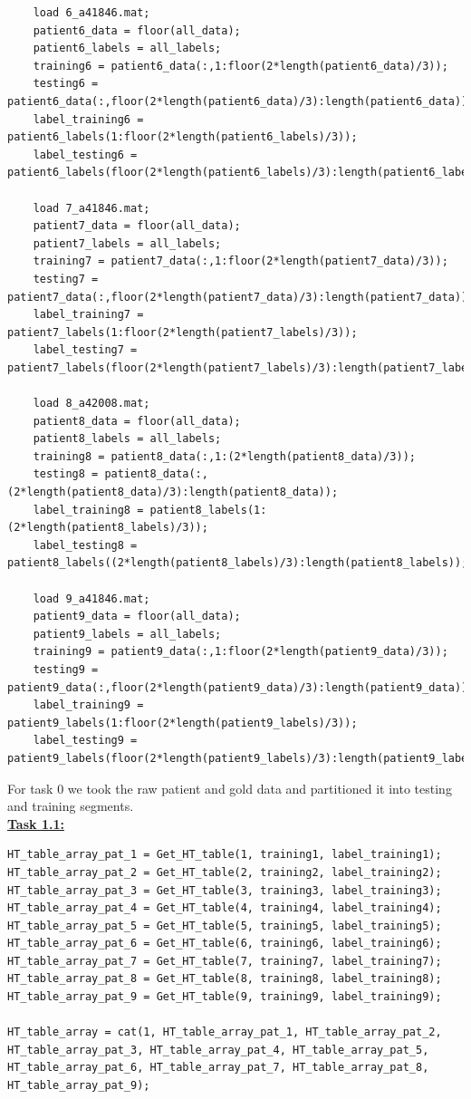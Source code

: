 \documentclass{article}
\begin{document}
\begin{lstlisting}
    load 6_a41846.mat;
    patient6_data = floor(all_data);
    patient6_labels = all_labels;
    training6 = patient6_data(:,1:floor(2*length(patient6_data)/3));
    testing6 = patient6_data(:,floor(2*length(patient6_data)/3):length(patient6_data));
    label_training6 = patient6_labels(1:floor(2*length(patient6_labels)/3));
    label_testing6 = patient6_labels(floor(2*length(patient6_labels)/3):length(patient6_labels));

    load 7_a41846.mat;
    patient7_data = floor(all_data);
    patient7_labels = all_labels;
    training7 = patient7_data(:,1:floor(2*length(patient7_data)/3));
    testing7 = patient7_data(:,floor(2*length(patient7_data)/3):length(patient7_data));
    label_training7 = patient7_labels(1:floor(2*length(patient7_labels)/3));
    label_testing7 = patient7_labels(floor(2*length(patient7_labels)/3):length(patient7_labels));

    load 8_a42008.mat;
    patient8_data = floor(all_data);
    patient8_labels = all_labels;
    training8 = patient8_data(:,1:(2*length(patient8_data)/3));
    testing8 = patient8_data(:,(2*length(patient8_data)/3):length(patient8_data));
    label_training8 = patient8_labels(1:(2*length(patient8_labels)/3));
    label_testing8 = patient8_labels((2*length(patient8_labels)/3):length(patient8_labels));

    load 9_a41846.mat;
    patient9_data = floor(all_data);
    patient9_labels = all_labels;
    training9 = patient9_data(:,1:floor(2*length(patient9_data)/3));
    testing9 = patient9_data(:,floor(2*length(patient9_data)/3):length(patient9_data));
    label_training9 = patient9_labels(1:floor(2*length(patient9_labels)/3));
    label_testing9 = patient9_labels(floor(2*length(patient9_labels)/3):length(patient9_labels));
\end{lstlisting}
For task 0 we took the raw patient and gold data and partitioned it into testing and training segments.
\\ \underline{\textbf{Task 1.1:}}
\begin{lstlisting}
HT_table_array_pat_1 = Get_HT_table(1, training1, label_training1);
HT_table_array_pat_2 = Get_HT_table(2, training2, label_training2);
HT_table_array_pat_3 = Get_HT_table(3, training3, label_training3);
HT_table_array_pat_4 = Get_HT_table(4, training4, label_training4);
HT_table_array_pat_5 = Get_HT_table(5, training5, label_training5);
HT_table_array_pat_6 = Get_HT_table(6, training6, label_training6);
HT_table_array_pat_7 = Get_HT_table(7, training7, label_training7);
HT_table_array_pat_8 = Get_HT_table(8, training8, label_training8);
HT_table_array_pat_9 = Get_HT_table(9, training9, label_training9);

HT_table_array = cat(1, HT_table_array_pat_1, HT_table_array_pat_2, HT_table_array_pat_3, HT_table_array_pat_4, HT_table_array_pat_5, HT_table_array_pat_6, HT_table_array_pat_7, HT_table_array_pat_8, HT_table_array_pat_9);
\end{lstlisting}
\end{document}
